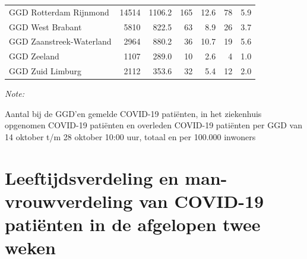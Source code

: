 \documentclass[
  english,
  man,floatsintext]{apa6}
\begin{document}
\begin{table}[H]
\begin{threeparttable}
\begin{tabular}{lrrrrrr}
GGD Rotterdam Rijnmond & 14514 & 1106.2 & 165 & 12.6 & 78 & 5.9\\
GGD West Brabant & 5810 & 822.5 & 63 & 8.9 & 26 & 3.7\\
GGD Zaanstreek-Waterland & 2964 & 880.2 & 36 & 10.7 & 19 & 5.6\\
GGD Zeeland & 1107 & 289.0 & 10 & 2.6 & 4 & 1.0\\
GGD Zuid Limburg & 2112 & 353.6 & 32 & 5.4 & 12 & 2.0\\
\bottomrule
\end{tabular}
\begin{tablenotes}
\item \textit{Note: } 
\item Aantal bij de GGD’en gemelde COVID-19 patiënten, in het ziekenhuis opgenomen COVID-19 patiënten en overleden COVID-19 patiënten per GGD van 14 oktober t/m 28 oktober 10:00 uur, totaal en per 100.000 inwoners
\end{tablenotes}
\end{threeparttable}
\endgroup{}
\end{table}

\newpage

\hypertarget{leeftijdsverdeling-en-man-vrouwverdeling-van-covid-19-patiuxebnten-in-de-afgelopen-twee-weken}{%
\section{Leeftijdsverdeling en man-vrouwverdeling van COVID-19 patiënten in de afgelopen twee weken}\label{leeftijdsverdeling-en-man-vrouwverdeling-van-covid-19-patiuxebnten-in-de-afgelopen-twee-weken}}
\end{document}
